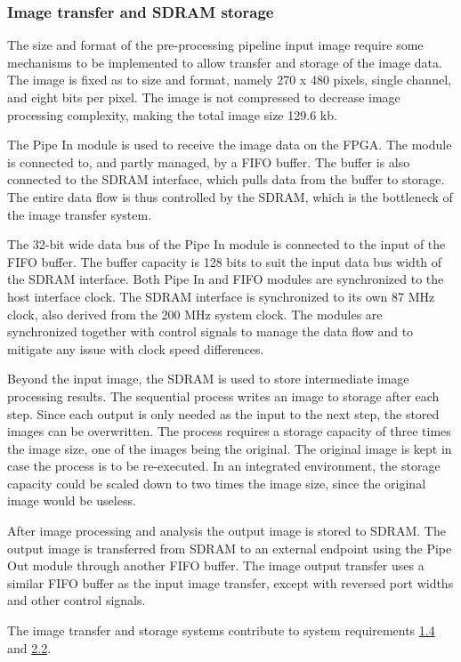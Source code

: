 \documentclass[12pt]{report}
\begin{document}
\subsubsection{Image transfer and SDRAM storage}
The size and format of the pre-processing pipeline input image require some mechanisms to be implemented to allow transfer and storage of the image data. The image is fixed as to size and format, namely 270 x 480 pixels, single channel, and eight bits per pixel. The image is not compressed to decrease image processing complexity, making the total image size 129.6 kb.
\par
The Pipe In module is used to receive the image data on the FPGA. The module is connected to, and partly managed, by a FIFO buffer. The buffer is also connected to the SDRAM interface, which pulls data from the buffer to storage. The entire data flow is thus controlled by the SDRAM, which is the bottleneck of the image transfer system.
\par
The 32-bit wide data bus of the Pipe In module is connected to the input of the FIFO buffer. The buffer capacity is 128 bits to suit the input data bus width of the SDRAM interface. Both Pipe In and FIFO modules are synchronized to the host interface clock. The SDRAM interface is synchronized to its own 87 MHz clock, also derived from the 200 MHz system clock. The modules are synchronized together with control signals to manage the data flow and to mitigate any issue with clock speed differences.
\par
Beyond the input image, the SDRAM is used to store intermediate image processing results. The sequential process writes an image to storage after each step. Since each output is only needed as the input to the next step, the stored images can be overwritten. The process requires a storage capacity of three times the image size, one of the images being the original. The original image is kept in case the process is to be re-executed. In an integrated environment, the storage capacity could be scaled down to two times the image size, since the original image would be useless. %
\par
After image processing and analysis the output image is stored to SDRAM. The output image is transferred from SDRAM to an external endpoint using the Pipe Out module through another FIFO buffer. The image output transfer uses a similar FIFO buffer as the input image transfer, except with reversed port widths and other control signals.   
\par
The image transfer and storage systems contribute to system requirements \hyperref[req1.4]{1.4} and \hyperref[req2.2]{2.2}.
\end{document}
